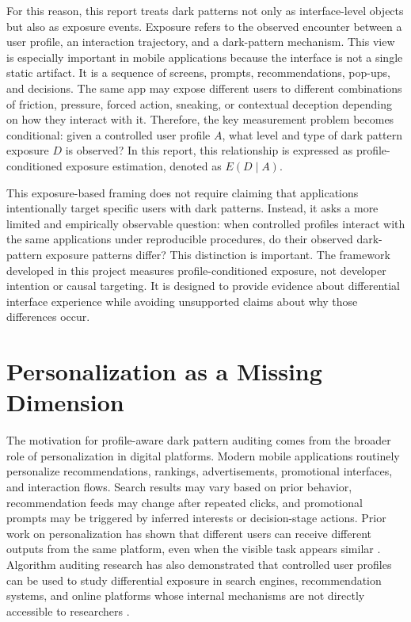 For this reason, this report treats dark patterns not only as interface-level objects but also as exposure events. Exposure refers to the observed encounter between a user profile, an interaction trajectory, and a dark-pattern mechanism. This view is especially important in mobile applications because the interface is not a single static artifact. It is a sequence of screens, prompts, recommendations, pop-ups, and decisions. The same app may expose different users to different combinations of friction, pressure, forced action, sneaking, or contextual deception depending on how they interact with it. Therefore, the key measurement problem becomes conditional: given a controlled user profile \(A\), what level and type of dark pattern exposure \(D\) is observed? In this report, this relationship is expressed as profile-conditioned exposure estimation, denoted as \(E(D \mid A)\).

This exposure-based framing does not require claiming that applications intentionally target specific users with dark patterns. Instead, it asks a more limited and empirically observable question: when controlled profiles interact with the same applications under reproducible procedures, do their observed dark-pattern exposure patterns differ? This distinction is important. The framework developed in this project measures profile-conditioned exposure, not developer intention or causal targeting. It is designed to provide evidence about differential interface experience while avoiding unsupported claims about why those differences occur.

\section{Personalization as a Missing Dimension}

The motivation for profile-aware dark pattern auditing comes from the broader role of personalization in digital platforms. Modern mobile applications routinely personalize recommendations, rankings, advertisements, promotional interfaces, and interaction flows. Search results may vary based on prior behavior, recommendation feeds may change after repeated clicks, and promotional prompts may be triggered by inferred interests or decision-stage actions. Prior work on personalization has shown that different users can receive different outputs from the same platform, even when the visible task appears similar \cite{hannak2013personalization}. Algorithm auditing research has also demonstrated that controlled user profiles can be used to study differential exposure in search engines, recommendation systems, and online platforms whose internal mechanisms are not directly accessible to researchers \cite{sandvig2014auditing,ribeiro2020auditing,haroon2023youtubeaudit}.

